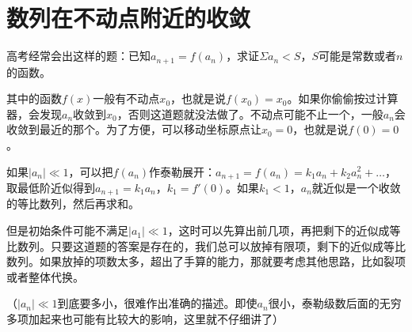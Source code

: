\section{数列在不动点附近的收敛}
高考经常会出这样的题：已知$a_{n+1}=f(a_n)$，求证$\Sigma a_n<S$，$S$可能是常数或者$n$的函数。

其中的函数$f(x)$一般有不动点$x_0$，也就是说$f(x_0)=x_0$。如果你偷偷按过计算器，会发现$a_n$收敛到$x_0$，否则这道题就没法做了。不动点可能不止一个，一般$a_n$会收敛到最近的那个。为了方便，可以移动坐标原点让$x_0=0$，也就是说$f(0)=0$。

如果$|a_n| \ll 1$，可以把$f(a_n)$作泰勒展开：$a_{n+1}=f(a_n)=k_1 a_n+k_2 a_n^2+\dots$，取最低阶近似得到$a_{n+1}=k_1 a_n$，$k_1=f'(0)$。如果$k_1<1$，$a_n$就近似是一个收敛的等比数列，然后再求和。

但是初始条件可能不满足$|a_1| \ll 1$，这时可以先算出前几项，再把剩下的近似成等比数列。只要这道题的答案是存在的，我们总可以放掉有限项，剩下的近似成等比数列。如果放掉的项数太多，超出了手算的能力，那就要考虑其他思路，比如裂项或者整体代换。

（$|a_n| \ll 1$到底要多小，很难作出准确的描述。即使$a_n$很小，泰勒级数后面的无穷多项加起来也可能有比较大的影响，这里就不仔细讲了）
